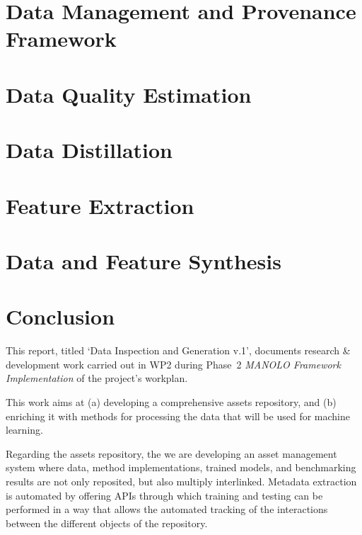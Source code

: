 \documentclass{manolo}
\newcommand{\quotes}[1]{`#1'}
\begin{document}
\clearpage
\section{Data Management and Provenance Framework}
\label{sec:datmgmt}


\clearpage
\section{Data Quality Estimation}
\label{sec:datqual}


\clearpage
\section{Data Distillation}
\label{sec:datdist}


\clearpage
\section{Feature Extraction}
\label{sec:featextr}


\clearpage
\section{Data and Feature Synthesis}
\label{sec:datsynth}


\clearpage
\section{Conclusion}

This report, titled \quotes{Data Inspection and Generation v.1},
documents research \& development work carried out in WP2 during
Phase~2 \emph{MANOLO Framework Implementation} of the project's
workplan.

This work aims at (a) developing a comprehensive assets repository,
and (b) enriching it with methods for processing the data that will
be used for machine learning.

Regarding the assets repository, the we are developing an asset
management system where data, method implementations, trained models,
and benchmarking results are not only reposited, but also multiply
interlinked. Metadata extraction is automated by offering APIs through
which training and testing can be performed in a way that allows the
automated tracking of the interactions between the different objects of
the repository.
\end{document}
